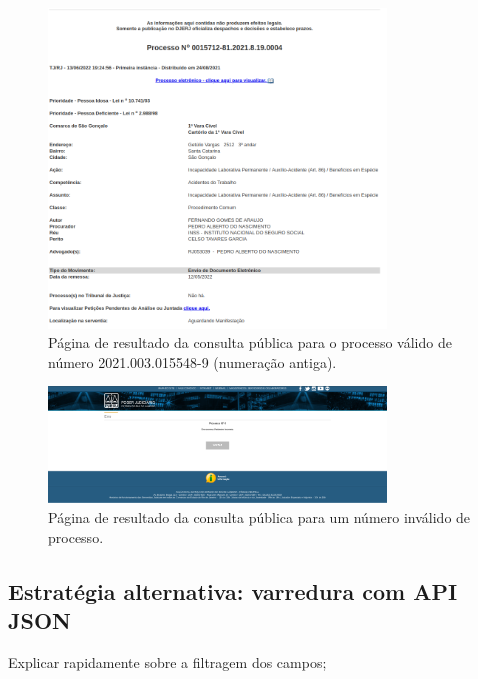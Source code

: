 \begin{figure}[H]
    \centering{}
    \includegraphics[width=0.8\textwidth,keepaspectratio]{img/exemplo-resultado-consulta-publica-1.png}
    \caption{%
        Página de resultado da consulta pública para o processo válido de
        número 2021.003.015548-9 (numeração antiga).
    }
    \label{fig:exemplo-pagina-ww4}
\end{figure}

\begin{figure}[H]
    \centering{}
    \includegraphics[width=0.8\textwidth,keepaspectratio]{img/exemplo-tjrj-pagina-erro}
    \caption{%
        Página de resultado da consulta pública para um número inválido de processo.
    }
    \label{fig:exemplo-tjrj-pagina-erro}
\end{figure}

\subsection{Estratégia alternativa: varredura com API JSON\label{sub:estrategia-api-json}}

\begin{todolist}
    \item Explicar rapidamente sobre a filtragem dos campos;
\end{todolist}

